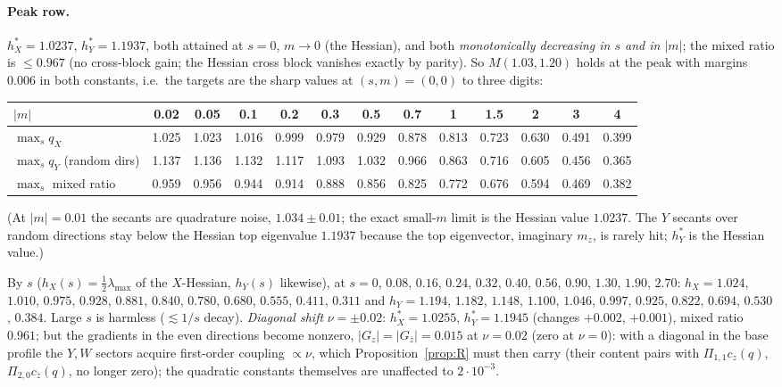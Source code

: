 \paragraph{Peak row.} $h_X^*=1.0237$, $h_Y^*=1.1937$, both attained at $s=0$, $m\to0$ (the Hessian), and both \emph{monotonically decreasing in $s$ and in $|m|$}; the mixed ratio is
$\le0.967$ (no cross-block gain; the Hessian cross block vanishes exactly by parity). So $M(1.03,1.20)$ holds at the peak with margins $0.006$ in both constants, i.e.\ the targets are the sharp
values at $(s,m)=(0,0)$ to three digits:
\begin{center}\scriptsize
\begin{tabular}{l|cccccccccccc}\toprule
$|m|$ & 0.02 & 0.05 & 0.1 & 0.2 & 0.3 & 0.5 & 0.7 & 1 & 1.5 & 2 & 3 & 4\\\midrule
$\max_s q_X$ & 1.025 & 1.023 & 1.016 & 0.999 & 0.979 & 0.929 & 0.878 & 0.813 & 0.723 & 0.630 & 0.491 & 0.399\\
$\max_s q_Y$ (random dirs) & 1.137 & 1.136 & 1.132 & 1.117 & 1.093 & 1.032 & 0.966 & 0.863 & 0.716 & 0.605 & 0.456 & 0.365\\
$\max_s$ mixed ratio & 0.959 & 0.956 & 0.944 & 0.914 & 0.888 & 0.856 & 0.825 & 0.772 & 0.676 & 0.594 & 0.469 & 0.382\\\bottomrule
\end{tabular}
\end{center}
{\footnotesize (At $|m|=0.01$ the secants are quadrature noise, $1.034\pm0.01$; the exact small-$m$ limit is the Hessian value $1.0237$. The $Y$ secants over random directions stay below the
Hessian top eigenvalue $1.1937$ because the top eigenvector, imaginary $m_z$, is rarely hit; $h_Y^*$ is the Hessian value.)}\par
By $s$ ($h_X(s)=\frac12\lambda_{\max}$ of the $X$-Hessian, $h_Y(s)$ likewise), at $s=0$, $0.08$, $0.16$, $0.24$, $0.32$, $0.40$, $0.56$, $0.90$, $1.30$, $1.90$, $2.70$:
$h_X=1.024$, $1.010$, $0.975$, $0.928$, $0.881$, $0.840$, $0.780$, $0.680$, $0.555$, $0.411$, $0.311$ and $h_Y=1.194$, $1.182$, $1.148$, $1.100$, $1.046$, $0.997$, $0.925$, $0.822$, $0.694$,
$0.530$, $0.384$. Large $s$ is harmless ($\lesssim1/s$ decay). \emph{Diagonal shift} $\nu=\pm0.02$: $h_X^*=1.0255$, $h_Y^*=1.1945$
(changes $+0.002$, $+0.001$), mixed ratio $0.961$; but the gradients in the even directions become nonzero, $|G_z|=|G_{\bar z}|=0.015$ at $\nu=0.02$ (zero at $\nu=0$): with a diagonal in the base
profile the $Y,W$ sectors acquire first-order coupling $\propto\nu$, which Proposition~\ref{prop:R} must then carry (their content pairs with $\Pi_{1,1}c_z(q)$, $\Pi_{2,0}c_{\bar z}(q)$, no longer
zero); the quadratic constants themselves are unaffected to $2\cdot10^{-3}$.

